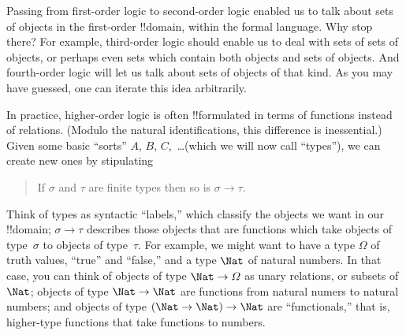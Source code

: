 \documentclass[../../../include/open-logic-section]{subfiles}
\begin{document}


Passing from first-order logic to second-order logic enabled us to
talk about sets of objects in the first-order !!{domain}, within the
formal language. Why stop there? For example, third-order logic should
enable us to deal with sets of sets of objects, or perhaps even sets
which contain both objects and sets of objects. And fourth-order logic
will let us talk about sets of objects of that kind. As you may have
guessed, one can iterate this idea arbitrarily.

In practice, higher-order logic is often !!{formula}ted in terms of
functions instead of relations. (Modulo the natural identifications,
this difference is inessential.) Given some basic ``sorts'' $A$, $B$,
$C$,~\dots (which we will now call ``types''), we can create new ones
by stipulating
\begin{quote}
If $\sigma$ and $\tau$ are finite types then so is $\sigma \to \tau$.
\end{quote}
Think of types as syntactic ``labels,'' which classify the objects we
want in our !!{domain}; $\sigma \to \tau$ describes those objects that
are functions which take objects of type~$\sigma$ to objects of
type~$\tau$. For example, we might want to have a type $\Omega$ of
truth values, ``true'' and ``false,'' and a type $\Nat$ of natural
numbers. In that case, you can think of objects of type $\Nat \to
\Omega$ as unary relations, or subsets of $\Nat$; objects of type
$\Nat \to \Nat$ are functions from natural numers to natural numbers;
and objects of type $(\Nat \to \Nat) \to \Nat$ are ``functionals,''
that is, higher-type functions that take functions to numbers.
\end{document}
